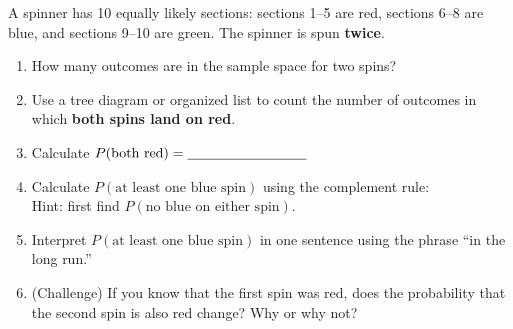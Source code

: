 \documentclass[10pt]{article}
\begin{document}
\vspace{0.1in}

\begin{tcolorbox}[colback=sky, colframe=navy, boxrule=1pt, arc=2mm,
    left=4mm, right=4mm, top=3mm, bottom=3mm,
    title={\bfseries Tier E \enspace Extension --- Multi-Stage Sample Spaces}]
\small

A spinner has 10 equally likely sections: sections 1--5 are red, sections 6--8 are
blue, and sections 9--10 are green. The spinner is spun \textbf{twice}.

\begin{enumerate}[leftmargin=1.5em, itemsep=10pt]
  \item How many outcomes are in the sample space for two spins? \blank{3cm}
  \item Use a tree diagram or organized list to count the number of outcomes in which
        \textbf{both spins land on red}.
        \vspace{40pt}
  \item Calculate $P(\text{both red}) = \blank{3cm}$
  \item Calculate $P(\text{at least one blue spin}) $ using the complement rule:\\
        Hint: first find $P(\text{no blue on either spin})$.
        \vspace{40pt}
  \item Interpret $P(\text{at least one blue spin})$ in one sentence using the phrase
        ``in the long run.''\\
        \writeline\writeline
  \item (Challenge) If you know that the first spin was red, does the probability that
        the second spin is also red change? Why or why not?\\
        \writeline\writeline
\end{enumerate}

\end{tcolorbox}
\end{document}
